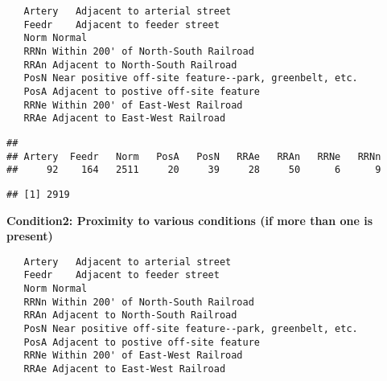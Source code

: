 \documentclass[]{article}
\newenvironment{Shaded}{\begin{snugshade}}{\end{snugshade}}
\newcommand{\KeywordTok}[1]{\textcolor[rgb]{0.13,0.29,0.53}{\textbf{#1}}}
\newcommand{\StringTok}[1]{\textcolor[rgb]{0.31,0.60,0.02}{#1}}
\newcommand{\CommentTok}[1]{\textcolor[rgb]{0.56,0.35,0.01}{\textit{#1}}}
\newcommand{\OperatorTok}[1]{\textcolor[rgb]{0.81,0.36,0.00}{\textbf{#1}}}
\newcommand{\NormalTok}[1]{#1}
\begin{document}
\begin{verbatim}
   Artery   Adjacent to arterial street
   Feedr    Adjacent to feeder street   
   Norm Normal  
   RRNn Within 200' of North-South Railroad
   RRAn Adjacent to North-South Railroad
   PosN Near positive off-site feature--park, greenbelt, etc.
   PosA Adjacent to postive off-site feature
   RRNe Within 200' of East-West Railroad
   RRAe Adjacent to East-West Railroad
\end{verbatim}

\begin{Shaded}
\end{Shaded}

\begin{verbatim}
## 
## Artery  Feedr   Norm   PosA   PosN   RRAe   RRAn   RRNe   RRNn 
##     92    164   2511     20     39     28     50      6      9
\end{verbatim}

\begin{Shaded}
\end{Shaded}

\begin{verbatim}
## [1] 2919
\end{verbatim}

\textbf{Condition2: Proximity to various conditions (if more than one is
present)}

\begin{verbatim}
   Artery   Adjacent to arterial street
   Feedr    Adjacent to feeder street   
   Norm Normal  
   RRNn Within 200' of North-South Railroad
   RRAn Adjacent to North-South Railroad
   PosN Near positive off-site feature--park, greenbelt, etc.
   PosA Adjacent to postive off-site feature
   RRNe Within 200' of East-West Railroad
   RRAe Adjacent to East-West Railroad
\end{verbatim}

\begin{Shaded}
\end{Shaded}
\end{document}
